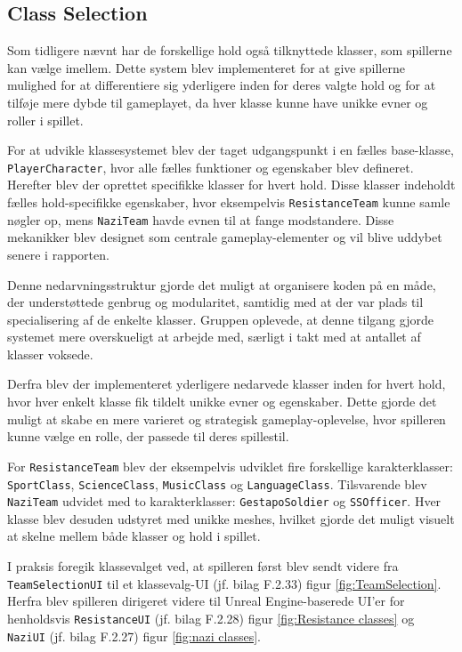 \newpage
\subsection{Class Selection}
Som tidligere nævnt har de forskellige hold også tilknyttede klasser, som spillerne kan vælge imellem. Dette system blev implementeret for at give spillerne mulighed for at differentiere sig yderligere inden for deres valgte hold og for at tilføje mere dybde til gameplayet, da hver klasse kunne have unikke evner og roller i spillet.

For at udvikle klassesystemet blev der taget udgangspunkt i en fælles base-klasse, \texttt{PlayerCharacter}, hvor alle fælles funktioner og egenskaber blev defineret. Herefter blev der oprettet specifikke klasser for hvert hold. Disse klasser indeholdt fælles hold-specifikke egenskaber, hvor eksempelvis \texttt{ResistanceTeam} kunne samle nøgler op, mens \texttt{NaziTeam} havde evnen til at fange modstandere. Disse mekanikker blev designet som centrale gameplay-elementer og vil blive uddybet senere i rapporten.

Denne nedarvningsstruktur gjorde det muligt at organisere koden på en måde, der understøttede genbrug og modularitet, samtidig med at der var plads til specialisering af de enkelte klasser. Gruppen oplevede, at denne tilgang gjorde systemet mere overskueligt at arbejde med, særligt i takt med at antallet af klasser voksede.

Derfra blev der implementeret yderligere nedarvede klasser inden for hvert hold, hvor hver enkelt klasse fik tildelt unikke evner og egenskaber. Dette gjorde det muligt at skabe en mere varieret og strategisk gameplay-oplevelse, hvor spilleren kunne vælge en rolle, der passede til deres spillestil.

For \texttt{ResistanceTeam} blev der eksempelvis udviklet fire forskellige karakterklasser: \texttt{SportClass}, \texttt{ScienceClass}, \texttt{MusicClass} og \texttt{LanguageClass}. Tilsvarende blev \texttt{NaziTeam} udvidet med to karakterklasser: \texttt{GestapoSoldier} og \texttt{SSOfficer}. Hver klasse blev desuden udstyret med unikke meshes, hvilket gjorde det muligt visuelt at skelne mellem både klasser og hold i spillet.

I praksis foregik klassevalget ved, at spilleren først blev sendt videre fra \texttt{TeamSelectionUI} til et klassevalg-UI (jf. bilag F.2.33) figur \ref{fig:TeamSelection}. Herfra blev spilleren dirigeret videre til Unreal Engine-baserede UI’er for henholdsvis \texttt{ResistanceUI} (jf. bilag F.2.28) figur \ref{fig:Resistance classes} og \texttt{NaziUI} (jf. bilag F.2.27) figur \ref{fig:nazi classes}.

